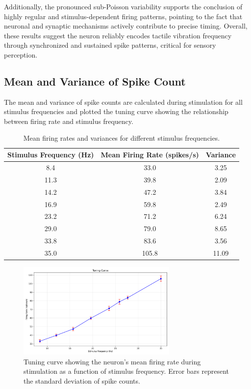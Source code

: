 \documentclass{article}
\begin{document}
Additionally, the pronounced sub-Poisson variability supports the conclusion of highly regular and stimulus-dependent firing patterns, pointing to the fact that neuronal and synaptic mechanisms actively contribute to precise timing. 
Overall, these results suggest the neuron reliably encodes tactile vibration frequency through synchronized and sustained spike patterns, critical for sensory perception.

\subsection{Mean and Variance of Spike Count}

The mean and variance of spike counts are calculated during stimulation for all stimulus frequencies and plotted the tuning curve showing the relationship between firing rate and stimulus frequency.




\begin{table}[H]
\centering
\begin{tabular}{ccc}
\toprule
\textbf{Stimulus Frequency (Hz)} & \textbf{Mean Firing Rate (spikes/s)} & \textbf{Variance} \\
\midrule
8.4 & 33.0 & 3.25 \\
11.3 & 39.8 & 2.09 \\
14.2 & 47.2 & 3.84 \\
16.9 & 59.8 & 2.49 \\
23.2 & 71.2 & 6.24 \\
29.0 & 79.0 & 8.65 \\
33.8 & 83.6 & 3.56 \\
35.0 & 105.8 & 11.09 \\
\bottomrule
\end{tabular}
\caption{Mean firing rates and variances for different stimulus frequencies.}
\label{tab:tuning_data}
\end{table}

\begin{figure}[H]
\centering
\includegraphics[width=0.7\textwidth]{Fig8.png}
\caption{Tuning curve showing the neuron's mean firing rate during stimulation as a function of stimulus frequency. Error bars represent the standard deviation of spike counts.}
\label{fig:tuning_curve}
\end{figure}
\end{document}
